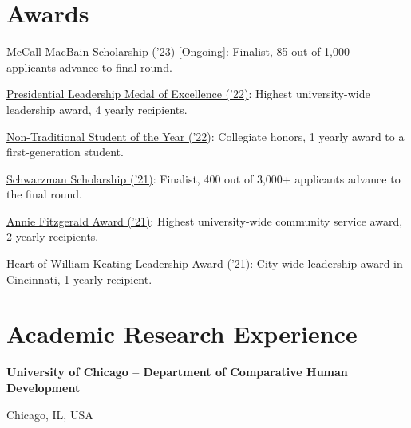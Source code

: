 \printbibliography[title={Peer-reviewed Publications}, type=article, resetnumbers=true]

\vspace{-5pt}
\section{Awards}
\begin{description}[font=$\bullet$]
\item{McCall MacBain Scholarship ('23) [Ongoing]: Finalist, 85 out of 1,000+ applicants advance to final round.}
\vspace{-7pt}
\item{\href{https://www.uc.edu/news/articles/2022/05/uc-president-awards-leadership-medals-to-six-2022-grads.html}{\underline{Presidential Leadership Medal of Excellence ('22)}}: Highest university-wide leadership award, 4 yearly recipients.}
\vspace{-7pt}
\item {\underline{Non-Traditional Student of the Year ('22)}: Collegiate honors, 1 yearly award to a first-generation student.}
\vspace{-7pt}
\item {\href{https://www.uc.edu/campus-life/nca/student-spotlight/profiles/daniel-posmik.html}{\underline{Schwarzman Scholarship ('21)}}: Finalist, 400 out of 3,000+ applicants advance to the final round.}
\vspace{-7pt}
\item {\href{https://www.uc.edu/campus-life/cce/volunteer/awardsandscholarships.html}{\underline{Annie Fitzgerald Award ('21)}}: Highest university-wide community service award, 2 yearly recipients.}
\vspace{-7pt}
\item {\href{https://www.youtube.com/watch?v=N1KdIjCjeRE}{\underline{Heart of William Keating Leadership Award ('21)}}: City-wide leadership award in Cincinnati, 1 yearly recipient.}
\end{description}

\vspace{-5pt}
\section{Academic Research Experience}
    \begin{minipage}{.75\linewidth} \begin{flushleft}
    		\textbf{University of Chicago -- Department of Comparative Human Development}
    	\end{flushleft} \end{minipage}
    \hfill 
    \begin{minipage}{.20\linewidth}\begin{flushright}
    	 Chicago, IL, USA
    	\end{flushright}\end{minipage}
     

